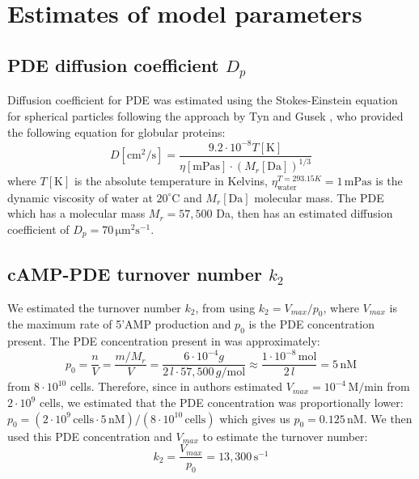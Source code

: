 \documentclass[10pt]{article}
\begin{document}
\section{Estimates of model parameters}


\subsection{PDE diffusion coefficient $D_p$}

Diffusion coefficient for PDE was estimated using the Stokes-Einstein
equation for spherical particles \cite{diffusion} following the approach by Tyn and
Gusek \cite{diffusion2}, who provided the following equation
for globular proteins: 
\begin{equation}
	D[\mathrm{cm^2/s}] = \frac{9.2\cdot10^{-8}T[\mathrm{K}]}{\eta[\mathrm{mPas}]\cdot\left(M_r[\mathrm{Da}]\right)^{1/3}}
\end{equation}
where $T[\mathrm{K}]$ is the absolute temperature in Kelvins, $\eta_{\mathrm{water}}^{T=293.15K}=1\,\mathrm{mPas}$ is the dynamic viscosity of water at $20^{\circ}\mathrm{C}$ and $M_{r}[\mathrm{Da}]$ molecular mass. The PDE which has a molecular mass $M_r = 57,500$ Da, then has an estimated diffusion coefficient of $D_p = 70\,\mathrm{\mu m^{2}s^{-1}}$.

\subsection{cAMP-PDE turnover number $k_2$}

We estimated the turnover number $k_{2}$, from \cite{k2paper,pde-purification}
using $k_{2}=V_{max}/p_{0}$, where $V_{max}$ is the maximum rate
of 5'AMP production and $p_0$ is the PDE concentration present. The
PDE concentration present in \cite{pde-purification} was approximately:
\[
p_{0}=\frac{n}{V}=\frac{m/M_{r}}{V}=\frac{6\cdot10^{-4}g}{2\, l\cdot57,500\, g/\mathrm{mol}}\approx\frac{1\cdot10^{-8}\,\mathrm{mol}}{2\, l}=5\,\mathrm{nM}
\]
from $8\cdot10^{10}$ cells. Therefore, since in \cite{k2paper} authors
estimated $V_{max}=10^{-4}\,\mathrm{M/min}$ from $2\cdot10^{9}$
cells, we estimated that the PDE concentration was proportionally
lower: $p_{0}=(2\cdot10^{9}\,\mathrm{cells}\cdot5\,\mathrm{nM})/(8\cdot10^{10}\,\mathrm{cells})$
which gives us $p_{0}=0.125\,\mathrm{nM}.$ We then used this PDE
concentration and $V_{max}$ to estimate the turnover number: 
\begin{equation}
	k_2 = \frac{V_{max}}{p_0} = 13,300\,\mathrm{s^{-1}}
\end{equation}
\end{document}
